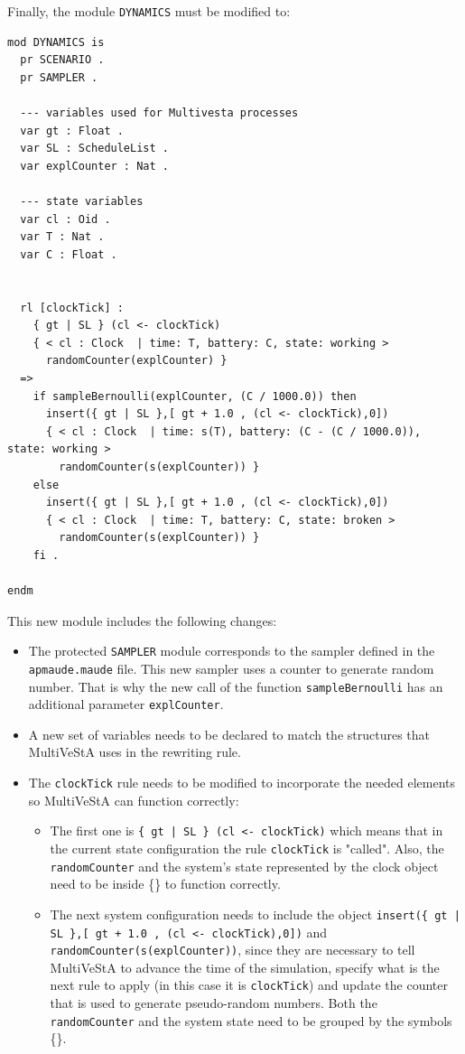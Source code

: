 Finally, the module \texttt{DYNAMICS} must be modified to:
\begin{lstlisting}
mod DYNAMICS is
  pr SCENARIO .
  pr SAMPLER .

  --- variables used for Multivesta processes
  var gt : Float .  
  var SL : ScheduleList .
  var explCounter : Nat .

  --- state variables
  var cl : Oid .
  var T : Nat .
  var C : Float .


  rl [clockTick] :
    { gt | SL } (cl <- clockTick)
    { < cl : Clock  | time: T, battery: C, state: working > 
      randomCounter(explCounter) }
  =>
    if sampleBernoulli(explCounter, (C / 1000.0)) then
      insert({ gt | SL },[ gt + 1.0 , (cl <- clockTick),0])
      { < cl : Clock  | time: s(T), battery: (C - (C / 1000.0)), state: working > 
        randomCounter(s(explCounter)) }
    else
      insert({ gt | SL },[ gt + 1.0 , (cl <- clockTick),0])
      { < cl : Clock  | time: T, battery: C, state: broken > 
        randomCounter(s(explCounter)) }
    fi .

endm
\end{lstlisting}
This new module includes the following changes:
\begin{itemize}
    \item The protected \texttt{SAMPLER} module corresponds to the sampler defined in the \texttt{apmaude.maude} file. This new sampler uses a counter to generate random number. That is why the new call of the function \texttt{sampleBernoulli} has an additional parameter \texttt{explCounter}.
    \item A new set of variables needs to be declared to match the structures that MultiVeStA uses in the rewriting rule.
    \item The \texttt{clockTick} rule needs to be modified to incorporate the needed elements so MultiVeStA can function correctly:
    \begin{itemize}
        \item The first one is \texttt{\{ gt | SL \} (cl <- clockTick)} which means that in the current state configuration the rule \texttt{clockTick} is "called". Also, the \texttt{randomCounter} and the system's state represented by the clock object need to be inside \{\} to function correctly. 
        \item The next system configuration needs to include the object \texttt{insert(\{ gt | SL \},[ gt + 1.0 , (cl <- clockTick),0])} and \\ \texttt{randomCounter(s(explCounter))}, since they are necessary to tell MultiVeStA to advance the time of the simulation, specify what is the next rule to apply (in this case it is \texttt{clockTick}) and update the counter that is used to generate pseudo-random numbers. Both the \texttt{randomCounter} and the system state need to be grouped by the symbols \{\}. 
    \end{itemize}
\end{itemize}

